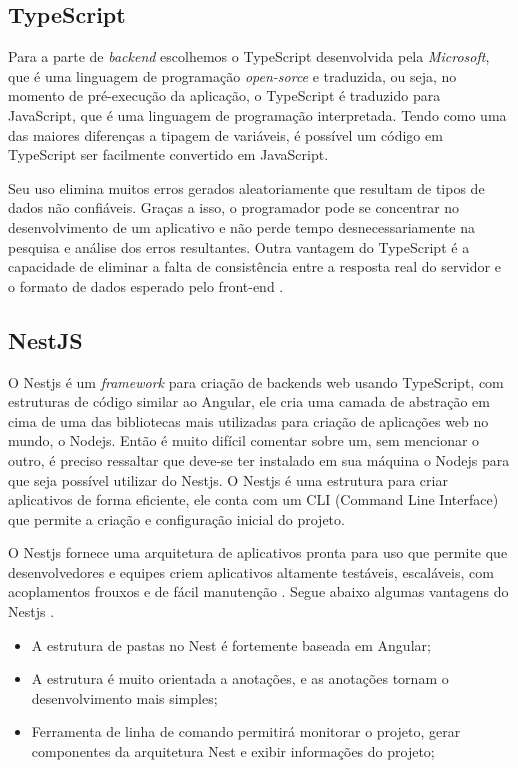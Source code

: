 \subsection{TypeScript}
Para a parte de \textit{backend} escolhemos o TypeScript desenvolvida pela \textit{Microsoft}, que é uma linguagem de programação \textit{open-sorce} e traduzida, ou seja, no momento de pré-execução da aplicação, o TypeScript é traduzido para JavaScript, que é uma linguagem de programação interpretada. Tendo como uma das maiores diferenças a tipagem de variáveis, é possível um código em TypeScript ser facilmente convertido em JavaScript. 

Seu uso elimina muitos erros gerados aleatoriamente que resultam de tipos de dados não confiáveis. Graças a isso, o programador pode se concentrar no desenvolvimento de um aplicativo e não perde tempo desnecessariamente na pesquisa e análise dos erros resultantes. Outra vantagem do TypeScript é a capacidade de eliminar a falta de consistência entre a resposta real do servidor e o formato de dados esperado pelo front-end \cite{Jakub2019TypeScript}.

\subsection{NestJS}
O Nestjs é um \textit{framework} para criação de backends web usando TypeScript, com estruturas de código similar ao Angular, ele cria uma camada de abstração em cima de uma das bibliotecas mais utilizadas para criação de aplicações web no mundo, o Nodejs.  Então é muito difícil comentar sobre um, sem mencionar o outro, é preciso ressaltar que deve-se ter instalado em sua máquina o Nodejs para que seja possível utilizar do Nestjs. O Nestjs é uma estrutura para criar aplicativos de forma eficiente, ele conta com um CLI (Command Line Interface) que permite a criação e configuração inicial do projeto.

O Nestjs fornece uma arquitetura de aplicativos pronta para uso que permite que desenvolvedores e equipes criem aplicativos altamente testáveis, escaláveis, com acoplamentos frouxos e de fácil manutenção \cite{kamil2020nestjs}. Segue abaixo algumas vantagens do Nestjs .

\begin{itemize}
    \item A estrutura de pastas no Nest é fortemente baseada em Angular; 
    \item A estrutura é muito orientada a anotações, e as anotações tornam o desenvolvimento mais simples;   
    \item Ferramenta de linha de comando permitirá monitorar o projeto, gerar componentes da arquitetura Nest e exibir informações do projeto;   
\end{itemize}

